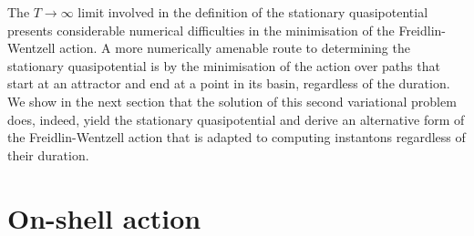 The $T\rightarrow\infty$ limit involved in the definition of the
stationary quasipotential presents considerable numerical difficulties
in the minimisation of the Freidlin-Wentzell action. A more numerically
amenable route to determining the stationary quasipotential is by
the minimisation of the action over paths that start at an attractor
and end at a point in its basin, regardless of the duration. We show
in the next section that the solution of this second variational problem
does, indeed, yield the stationary quasipotential and derive an alternative
form of the Freidlin-Wentzell action that is adapted to computing
instantons regardless of their duration. %

\section{On-shell action} \label{sec:Minima-of-the-action}

